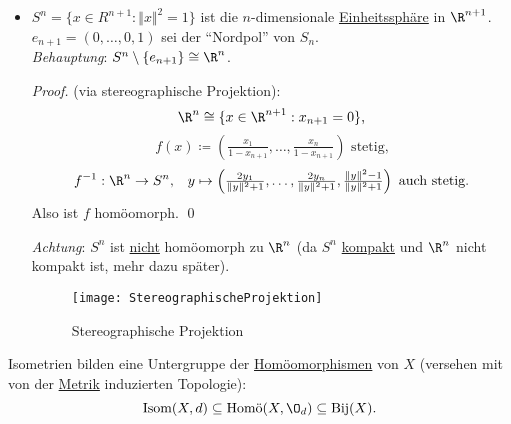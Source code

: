 \begin{example}
\begin{itemize}
      \begin{proof}
        (über \( \epsilon \)-\( \delta \)-Definition): \( \delta \coloneqq \epsilon \). \\
        \( d_X(x, y) < \delta \Rightarrow d_Y(f(x), f(y)) = d_X(x,y) < \delta = \epsilon \), also ist \( f \) stetig. \\
        Analog für \( f^{-1} \). \qed{}
      \end{proof}
    \item \( S^n = \{ x \in R^{n+1} : \Vert x \Vert^2 = 1 \} \) ist die \( n \)-dimensionale \hyperref[bsp:einheitssphaere]{Einheitssphäre} in \( \R^{n+1} \). \\
      \( e_{n+1} = (0,\dots,0,1) \) sei der ``Nordpol'' von \( S_n \). \\
      \emph{Behauptung}: \( S^n\setminus \{ e_{n+1} \} \cong \R^n \).
      \begin{proof}
        (via stereographische Projektion):
        \begin{equation*}
          \R^n \cong \{ x \in \R^{n+1} : x_{n+1} = 0 \}\text{,}
        \end{equation*}
        \begin{equation*}
          f(x) \coloneqq (\tfrac{x_1}{1-x_{n+1}}, \dots, \tfrac{x_n}{1-x_{n+1}}) \text{ stetig,}
        \end{equation*}
        \begin{equation*}
          f^{-1}: \R^n \to S^n\text{,} \quad y \mapsto \left( \tfrac{2y_1}{\Vert y \Vert^2+1}, \dots, \tfrac{2y_n}{\Vert y \Vert^2+1}, \tfrac{\Vert y \Vert^2-1}{\Vert y \Vert^2+1} \right)\text{ auch stetig.}
        \end{equation*}
        Also ist \( f \) homöomorph. \qed{}
      \end{proof}
      \emph{Achtung}: \( S^n \) ist \underline{nicht} homöomorph zu \( \R^n \) (da \( S^n \) \hyperref[def:kompakt]{kompakt} und \( \R^n \) nicht kompakt ist, mehr dazu später).
      \begin{figure}[H]
        \texttt{[image: StereographischeProjektion]}
        \caption{Stereographische Projektion}
      \end{figure}
  \end{itemize}
\end{example}

\begin{remark}
  Isometrien bilden eine Untergruppe der \hyperref[def:homoeomorphismus]{Homöomorphismen} von \( X \) (versehen mit von der \hyperref[def:metrik]{Metrik} induzierten Topologie):
  \begin{equation*}
    \text{Isom}(X, d) \subseteq \text{Homö}(X, \O_d) \subseteq \text{Bij}(X)\text{.}
  \end{equation*}
\end{remark}

